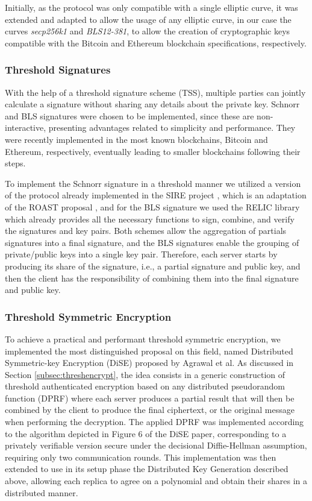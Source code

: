 \documentclass[runningheads]{llncs}
\begin{document}
Initially, as the protocol was only compatible with a single elliptic curve, it was extended and adapted to allow the usage of any elliptic curve, in our case the curves \textit{secp256k1} and \textit{BLS12-381}, to allow the creation of cryptographic keys compatible with the Bitcoin and Ethereum blockchain specifications, respectively.

\subsubsection{Threshold Signatures} \label{subsec:distributedsignatures}

With the help of a threshold signature scheme (TSS), multiple parties can jointly calculate a signature without sharing any details about the private key. Schnorr and BLS signatures were chosen to be implemented, since these are non-interactive, presenting advantages related to simplicity and performance. They were recently implemented in the most known blockchains, Bitcoin and Ethereum, respectively, eventually leading to smaller blockchains following their steps.

To implement the Schnorr signature \cite{schnorrnotes} in a threshold manner we utilized a version of the protocol already implemented in the SIRE project \cite{siregithub}, which is an adaptation of the ROAST proposal \cite{frost3}, and for the BLS signature \cite{blsdraft} we used the RELIC library \cite{relicgithub} which already provides all the necessary functions to sign, combine, and verify the signatures and key pairs. Both schemes allow the aggregation of partials signatures into a final signature, and the BLS signatures enable the grouping of private/public keys into a single key pair. Therefore, each server starts by producing its share of the signature, i.e., a partial signature and public key, and then the client has the responsibility of combining them into the final signature and public key.


\subsubsection{Threshold Symmetric Encryption} \label{subsec:distributedencryption}

To achieve a practical and performant threshold symmetric encryption, we implemented the most distinguished proposal on this field, named Distributed Symmetric-key Encryption (DiSE) \cite{dise}
proposed by Agrawal et al. As discussed in Section \ref{subsec:threshencrypt}, the idea consists in a generic construction of threshold authenticated encryption based on any distributed pseudorandom function (DPRF) where each server produces a partial result that will then be combined by the client to produce the final ciphertext, or the original message when performing the decryption. The applied DPRF was implemented according to the algorithm depicted in Figure 6 of the DiSE paper, corresponding to a privately verifiable version secure under the decisional Diffie-Hellman assumption, requiring only two communication rounds. This implementation was then extended to use in its setup phase the Distributed Key Generation described above, allowing each replica to agree on a polynomial and obtain their shares in a distributed manner.
\end{document}
